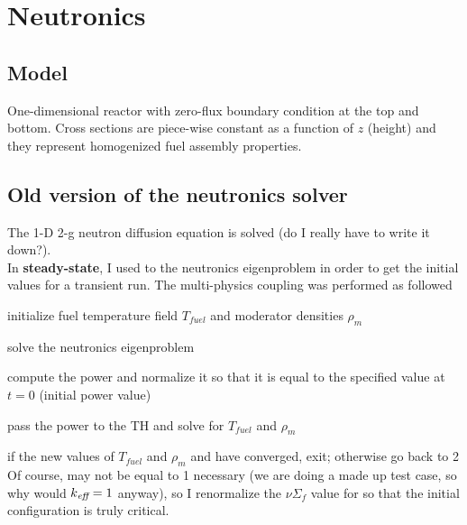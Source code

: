 \documentclass[11pt]{article}
\newcommand{\Tf}{\ensuremath{T_{\textit{fuel}}}\xspace}
\newcommand{\ro}{\ensuremath{\rho_{\textit{m}}}\xspace}
\begin{document}

{} 

\section{Neutronics}

\subsection{Model}

One-dimensional reactor with zero-flux boundary condition at the top and bottom. Cross sections are piece-wise constant as a function of $z$ (height) and they represent homogenized fuel assembly properties.

\subsection{Old version of the neutronics solver}

The 1-D 2-g neutron diffusion equation is solved (do I really have to write it down?).\\

In {\bf steady-state}, I used to the neutronics eigenproblem in order to get the initial values
for a transient run. The multi-physics coupling was performed as followed
\ben
\item initialize fuel temperature field \Tf and moderator densities \ro
\item solve the neutronics eigenproblem 
\item compute the power and normalize it so that it is equal to the specified value at $t=0$ (initial power value)
\item pass the power to the TH and solve for \Tf and \ro
\item if the new values of \Tf and \ro and \keff have converged, exit; otherwise go back to 2
\een
Of course, \keff may not be equal to 1 necessary (we are doing a made up test case, so why would $k_{\textit{eff}}=1$ anyway), so I renormalize the $\nu\Sigma_f$ value for \keff so that the initial configuration is truly critical.
\end{document}
